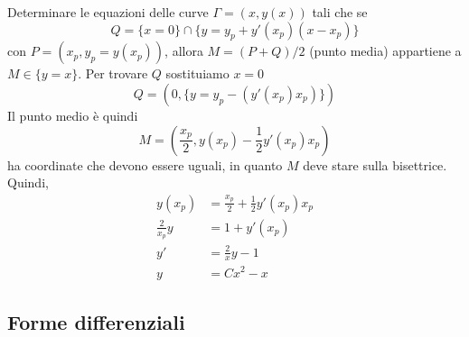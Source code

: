 \documentclass[a4paper]{article}
\begin{document}
\begin{snippetexercise}{}
    Determinare le equazioni delle curve \(\Gamma = (x,y(x))\)
    tali che se \[Q = \{ x = 0\} \cap \{ y = y_p + y'(x_p)(x-x_p)\}\]
    con \(P = (x_p, y_p = y(x_p))\), allora \(M = (P+Q)/2\) (punto media)
    appartiene a \(M \in \{y = x\}\).
    Per trovare \(Q\) sostituiamo \(x = 0\)
    \[
        Q = \left(0, \{y = y_p - (y'(x_p) x_p)\}\right)
    \]
    Il punto medio è quindi
    \[
        M = \left(\frac{x_p}{2}, y(x_p) - \frac{1}{2}y'(x_p)x_p\right)
    \]
    ha coordinate che devono essere uguali, in quanto \(M\) deve stare
    sulla bisettrice. Quindi,
    \begin{align*}
        y(x_p) &= \frac{x_p}{2} + \frac{1}{2}y'(x_p)x_p \\
        \frac{2}{x_p} y &= 1 + y'(x_p) \\
        y' &= \frac{2}{x}y - 1 \\
        y &= Cx^2 - x
    \end{align*}
\end{snippetexercise}

\subsection{Forme differenziali}
\end{document}
